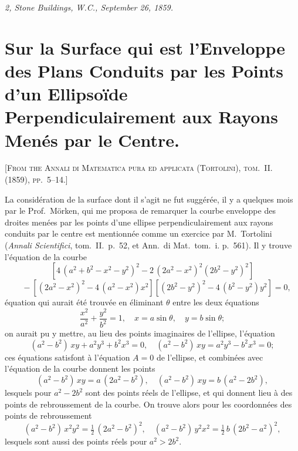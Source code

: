 \documentclass[11pt,a4paper]{book}
\begin{document}
\smallskip
\noindent\textit{2, Stone Buildings, W.C., September 26, 1859.}

\newpage


\setcounter{page}{123}

\section*{Sur la Surface qui est l'Enveloppe des Plans Conduits par les Points d'un Ellipsoïde Perpendiculairement aux Rayons Menés par le Centre.}
\label{paper:250}

\textsc{[From the Annali di Matematica pura ed applicata (Tortolini), tom.~II. (1859), pp.~5--14.]}

\medskip

La considération de la surface dont il s'agit ne fut suggérée, il y a quelques mois par le Prof.~Mörken, qui me proposa de remarquer la courbe enveloppe des droites menées par les points d'une ellipse perpendiculairement aux rayons conduits par le centre est mentionnée comme un exercice par M.~Tortolini (\textit{Annali Scientifici}, tom.~II.~p.~52, et Ann.~di Mat.~tom.~i. p.~561). Il y trouve l'équation de la courbe
\[
[4\,(a^2+b^2-x^2-y^2)^2 - 2\,(2a^2-x^2)^2(2b^2-y^2)^2]
\]
\[
\quad - [(2a^2-x^2)^2 - 4\,(a^2-x^2)x^2][(2b^2-y^2)^2 - 4\,(b^2-y^2)y^2] = 0,
\]
équation qui aurait été trouvée en éliminant $\theta$ entre les deux équations
\[
\frac{x^2}{a^2} + \frac{y^2}{b^2} = 1,\quad x = a\sin\theta,\quad y = b\sin\theta;
\]
on aurait pu y mettre, au lieu des points imaginaires de l'ellipse, l'équation
\[
(a^2-b^2)\,xy + a^2y^3 + b^2x^3 = 0,\quad (a^2-b^2)\,xy = a^2y^3 - b^2x^3 = 0;
\]
ces équations satisfont à l'équation $A=0$ de l'ellipse, et combinées avec l'équation de la courbe donnent les points
\[
(a^2-b^2)\,xy = a\,(2a^2-b^2),\quad (a^2-b^2)\,xy = b\,(a^2-2b^2),
\]
lesquels pour $a^2-2b^2$ sont des points réels de l'ellipse, et qui donnent lieu à des points de rebroussement de la courbe. On trouve alors pour les coordonnées des points de rebroussement
\[
(a^2-b^2)\,x^2y^2 = \tfrac{1}{2}\,(2a^2-b^2)^2,\quad (a^2-b^2)\,y^2x^2 = \tfrac{1}{2}\,b\,(2b^2-a^2)^2,
\]
lesquels sont aussi des points réels pour $a^2 > 2b^2$.
\end{document}
